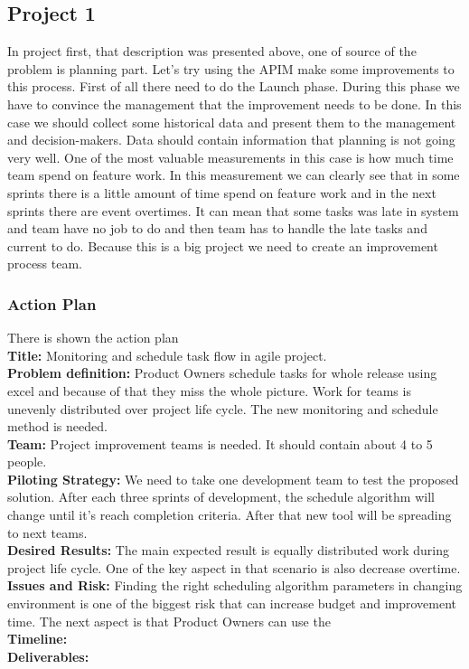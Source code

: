 \subsection*{Project 1}
In project first, that description was presented above, one of source of the problem is planning part. Let's try using the APIM make some improvements to this process.  First of all there need to do the Launch phase. During this phase we have to convince the management that the improvement needs to be done. In this case we should collect some historical data and present them to the management and decision-makers. Data should contain information that planning is not going very well. One of the most valuable measurements in this case is how much time team spend on feature work. In this measurement we can clearly see that in some sprints there is a little amount of time spend on feature work and in the next sprints there are event overtimes. It can mean that some tasks was late in system and team have no job to do and then team has to handle the late tasks and current to do. Because this is a big project we need to create an improvement process team. \\

\subsubsection*{Action Plan}
There is shown the action plan\\
\textbf{Title:}  Monitoring and schedule task flow in agile project.\\
\textbf{Problem definition:} Product Owners schedule tasks for whole release using excel and because of that they miss the whole picture. Work for teams is unevenly distributed over project life cycle. The new monitoring and schedule method is needed.\\
\textbf{Team:} Project improvement teams is needed. It should contain about 4 to 5 people.\\
\textbf{Piloting Strategy:} We need to take one development team to test the proposed solution. After each three sprints of development, the schedule algorithm will change until it's reach completion criteria. After that new tool will be spreading to next teams.\\
\textbf{Desired Results:} The main expected result is equally distributed work during project life cycle. One of the key aspect in that scenario is also decrease overtime.\\
\textbf{Issues and Risk:} Finding the right scheduling algorithm parameters in changing environment is one of the biggest risk that can increase budget and improvement time. The next aspect is that Product Owners can use the  \\
\textbf{Timeline:} \\
\textbf{Deliverables:} 